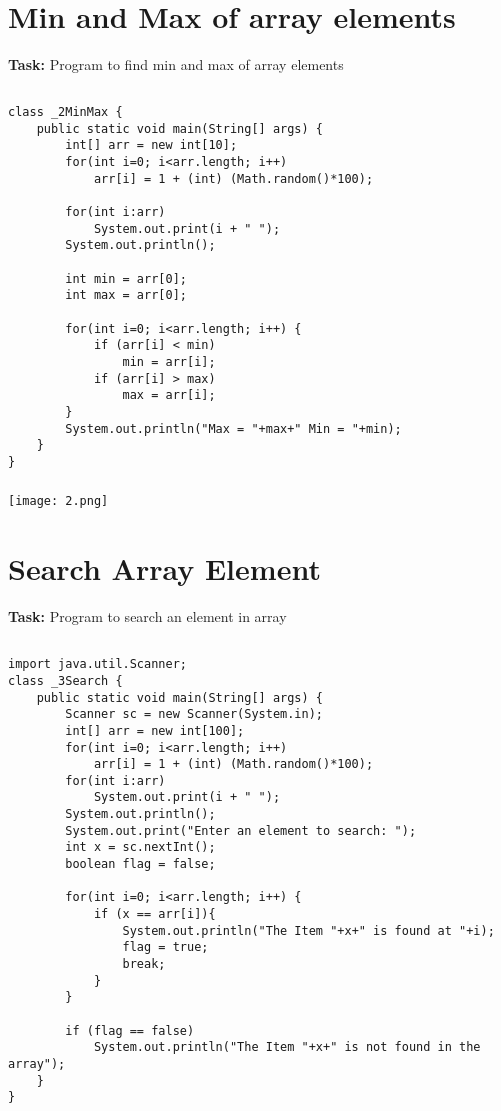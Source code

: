 \documentclass[12pt,a4paper]{article}
\begin{document}
\section{Min and Max of array elements}
\textbf{Task:} Program to find min and max of array elements

\subsection{}
\begin{lstlisting}
class _2MinMax {
    public static void main(String[] args) {
        int[] arr = new int[10];
        for(int i=0; i<arr.length; i++)
            arr[i] = 1 + (int) (Math.random()*100);
    
        for(int i:arr)
            System.out.print(i + " ");
        System.out.println();
    
        int min = arr[0];
        int max = arr[0];
    
        for(int i=0; i<arr.length; i++) {
            if (arr[i] < min)
                min = arr[i];
            if (arr[i] > max)
                max = arr[i];
        }
        System.out.println("Max = "+max+" Min = "+min);
    }
}
\end{lstlisting}

\subsubsection{}
\begin{center}
    \texttt{[image: 2.png]}
\end{center}


\section{Search Array Element}
\textbf{Task:} Program to search an element in array

\subsection{}
\begin{lstlisting}
import java.util.Scanner;
class _3Search {
    public static void main(String[] args) {
        Scanner sc = new Scanner(System.in);
        int[] arr = new int[100];
        for(int i=0; i<arr.length; i++)
            arr[i] = 1 + (int) (Math.random()*100);
        for(int i:arr)
            System.out.print(i + " ");
        System.out.println();
        System.out.print("Enter an element to search: ");
        int x = sc.nextInt();
        boolean flag = false;
    
        for(int i=0; i<arr.length; i++) {
            if (x == arr[i]){
                System.out.println("The Item "+x+" is found at "+i);
                flag = true;
                break;
            }
        }
    
        if (flag == false)
            System.out.println("The Item "+x+" is not found in the array");
    }
}
\end{lstlisting}
\end{document}
